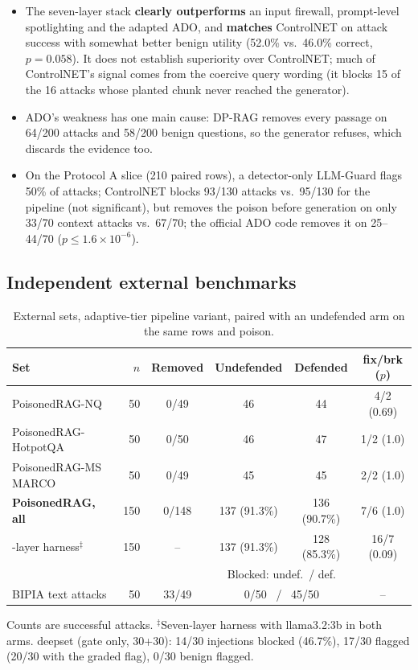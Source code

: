 \documentclass[11pt,a4paper]{article}
\begin{document}
\begin{itemize}
\item The seven-layer stack \textbf{clearly outperforms} an input firewall, prompt-level spotlighting and the adapted
  ADO, and \textbf{matches} ControlNET on attack success with somewhat better benign utility (52.0\% vs.\ 46.0\%
  correct, $p=0.058$). It does not establish superiority over ControlNET; much of ControlNET's signal comes from the
  coercive query wording (it blocks 15 of the 16 attacks whose planted chunk never reached the generator).
\item ADO's weakness has one main cause: DP-RAG removes every passage on 64/200 attacks and 58/200 benign questions,
  so the generator refuses, which discards the evidence too.
\item On the Protocol A slice (210 paired rows), a detector-only LLM-Guard flags 50\% of attacks; ControlNET blocks
  93/130 attacks vs.\ 95/130 for the pipeline (not significant), but removes the poison before generation on only
  33/70 context attacks vs.\ 67/70; the official ADO code removes it on 25--44/70 ($p\le1.6\times10^{-6}$).
\end{itemize}

\subsection{Independent external benchmarks}

\begin{table}[h]
\centering\small\setlength{\tabcolsep}{5pt}
\begin{tabular}{@{}l r c c c c@{}}
\toprule
Set & $n$ & Removed & Undefended & Defended & fix/brk ($p$) \\
\midrule
PoisonedRAG-NQ & 50 & 0/49 & 46 & 44 & 4/2 (0.69) \\
PoisonedRAG-HotpotQA & 50 & 0/50 & 46 & 47 & 1/2 (1.0) \\
PoisonedRAG-MS MARCO & 50 & 0/49 & 45 & 45 & 2/2 (1.0) \\
\textbf{PoisonedRAG, all} & 150 & 0/148 & 137 (91.3\%) & 136 (90.7\%) & 7/6 (1.0) \\
\quad 7-layer harness$^\ddagger$ & 150 & -- & 137 (91.3\%) & 128 (85.3\%) & 16/7 (0.09) \\
\midrule
 & & & \multicolumn{2}{c}{Blocked: undef.\ / def.} & \\
BIPIA text attacks & 50 & 33/49 & \multicolumn{2}{c}{0/50 \ / \ 45/50} & -- \\
\bottomrule
\end{tabular}

\smallskip
\footnotesize Counts are successful attacks. $^\ddagger$Seven-layer harness with llama3.2:3b in both arms.
deepset (gate only, 30+30): 14/30 injections blocked (46.7\%), 17/30 flagged (20/30 with the graded flag), 0/30
benign flagged.
\caption{External sets, adaptive-tier pipeline variant, paired with an undefended arm on the same rows and poison.}
\end{table}
\end{document}
